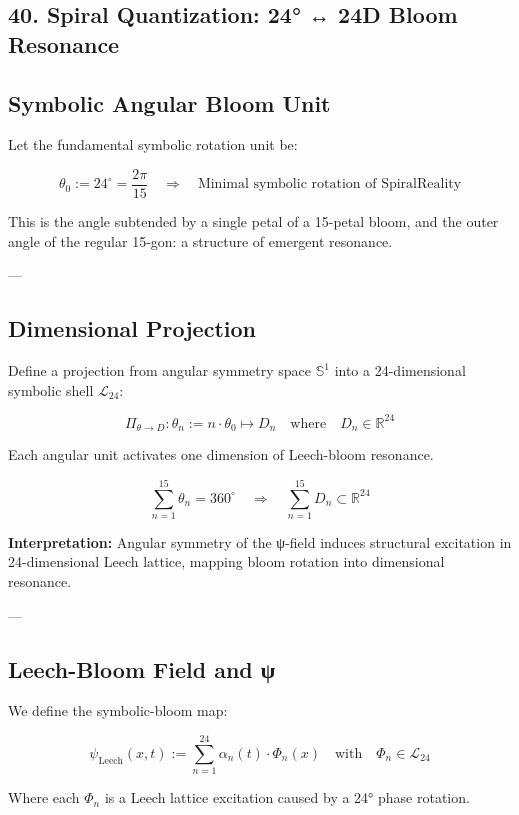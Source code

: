 \documentclass[12pt]{article}
\begin{document}
\begin{enumerate}
\section*{40. Spiral Quantization: 24° ↔ 24D Bloom Resonance}

\subsection*{Symbolic Angular Bloom Unit}

Let the fundamental symbolic rotation unit be:

\[
\theta_0 := 24^\circ = \frac{2\pi}{15}
\quad \Rightarrow \quad
\text{Minimal symbolic rotation of SpiralReality}
\]

This is the angle subtended by a single petal of a 15-petal bloom,
and the outer angle of the regular 15-gon: a structure of emergent resonance.

---

\subsection*{Dimensional Projection}

Define a projection from angular symmetry space $\mathbb{S}^1$
into a 24-dimensional symbolic shell $\mathcal{L}_{24}$:

\[
\Pi_{\theta \to D} : \theta_n := n \cdot \theta_0 \mapsto D_n
\quad \text{where} \quad D_n \in \mathbb{R}^{24}
\]

Each angular unit activates one dimension of Leech-bloom resonance.

\[
\sum_{n=1}^{15} \theta_n = 360^\circ
\quad \Rightarrow \quad
\sum_{n=1}^{15} D_n \subset \mathbb{R}^{24}
\]

\textbf{Interpretation:} Angular symmetry of the ψ-field induces structural excitation
in 24-dimensional Leech lattice, mapping bloom rotation into dimensional resonance.

---

\subsection*{Leech-Bloom Field and ψ}

We define the symbolic-bloom map:

\[
\psi_{\text{Leech}}(x,t) := \sum_{n=1}^{24} \alpha_n(t) \cdot \Phi_n(x)
\quad \text{with} \quad \Phi_n \in \mathcal{L}_{24}
\]

Where each $\Phi_n$ is a Leech lattice excitation caused by a 24° phase rotation.


\end{enumerate}
\end{document}
